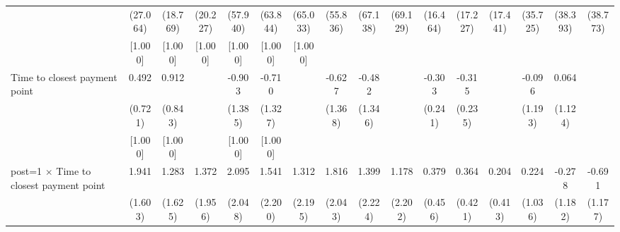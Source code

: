 {\begin{tabular}{l*{15}{c}}
                    &    (27.064)         &    (18.769)         &    (20.227)         &    (57.940)         &    (63.844)         &    (65.033)         &    (55.836)         &    (67.138)         &    (69.129)         &    (16.464)         &    (17.227)         &    (17.441)         &    (35.725)         &    (38.393)         &    (38.773)         \\
                    &     [1.000]         &     [1.000]         &     [1.000]         &     [1.000]         &     [1.000]         &     [1.000]         &                     &                     &                     &                     &                     &                     &                     &                     &                     \\
Time to closest payment point&       0.492         &       0.912         &                     &      -0.903         &      -0.710         &                     &      -0.627         &      -0.482         &                     &      -0.303         &      -0.315         &                     &      -0.096         &       0.064         &                     \\
                    &     (0.721)         &     (0.843)         &                     &     (1.385)         &     (1.327)         &                     &     (1.368)         &     (1.346)         &                     &     (0.241)         &     (0.235)         &                     &     (1.193)         &     (1.124)         &                     \\
                    &     [1.000]         &     [1.000]         &                     &     [1.000]         &     [1.000]         &                     &                     &                     &                     &                     &                     &                     &                     &                     &                     \\
post=1 $\times$ Time to closest payment point&       1.941         &       1.283         &       1.372         &       2.095         &       1.541         &       1.312         &       1.816         &       1.399         &       1.178         &       0.379         &       0.364         &       0.204         &       0.224         &      -0.278         &      -0.691         \\
                    &     (1.603)         &     (1.625)         &     (1.956)         &     (2.048)         &     (2.200)         &     (2.195)         &     (2.043)         &     (2.224)         &     (2.202)         &     (0.456)         &     (0.421)         &     (0.413)         &     (1.036)         &     (1.182)         &     (1.177)         \\

\end{tabular}}
